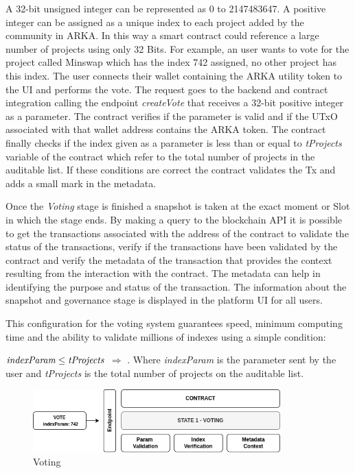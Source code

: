 \documentclass[12pt]{article}
\begin{document}
A 32-bit unsigned integer can be represented as 0 to 2147483647. A positive integer can be assigned as a unique index to each project added by the community in ARKA. In this way a smart contract could reference a large number of projects using only 32 Bits. For example, an user wants to vote for the project called Minswap which has the index 742 assigned, no other project has this index. The user connects their wallet containing the ARKA utility token to the UI and performs the vote. The request goes to the backend and contract integration calling the endpoint \emph{createVote} that receives a 32-bit positive integer as a parameter. The contract verifies if the parameter is valid and if the UTxO associated with that wallet address contains the ARKA token. The contract finally checks if the index given as a parameter is less than or equal to \emph{tProjects} variable of the contract which refer to the total number of projects in the auditable list. If these conditions are correct the contract validates the Tx and adds a small mark in the metadata.


Once the \emph{Voting} stage is finished a snapshot is taken at the exact moment or Slot in which the stage ends. By making a query to the blockchain API it is possible to get the transactions associated with the address of the contract to validate the status of the transactions, verify if the transactions have been validated by the contract and verify the metadata of the transaction that provides the context resulting from the interaction with the contract. The metadata can help in identifying the purpose and status of the transaction. The information about the snapshot and governance stage is displayed in the platform UI for all users.

This configuration for the voting system guarantees speed, minimum computing time and the ability to validate millions of indexes using a simple condition:

$\emph{indexParam} \leq \emph{tProjects}$  $\Rightarrow$ . Where \emph{indexParam} is the parameter sent by the user and \emph{tProjects} is the total number of projects on the auditable list.

\begin{figure}[ht]
  \centering
  \includegraphics[width=0.85\textwidth]{vote.png}
  \caption{Voting
  }
  \label{fig:mi_imagen}
\end{figure}
\end{document}
